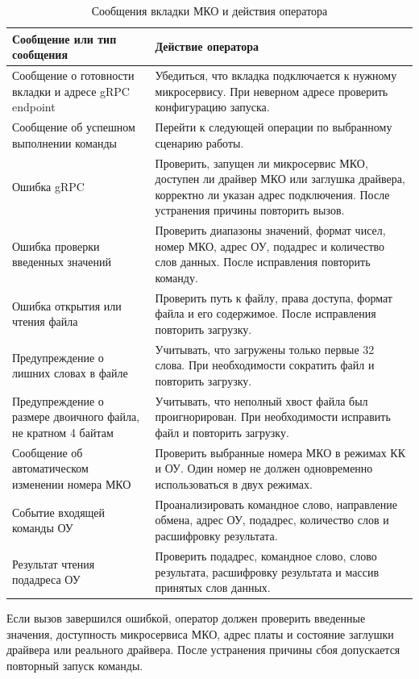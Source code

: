 \begin{table}[H]
	\caption{Сообщения вкладки МКО и действия оператора}
	\begin{tabularx}{\textwidth}{|p{}|X|}
		\hline
		\textbf{Сообщение или тип сообщения} & \textbf{Действие оператора} \\
		\hline
		Сообщение о готовности вкладки и адресе gRPC endpoint & Убедиться, что вкладка подключается к нужному микросервису. При неверном адресе проверить конфигурацию запуска. \\
		\hline
		Сообщение об успешном выполнении команды & Перейти к следующей операции по выбранному сценарию работы. \\
		\hline
		Ошибка gRPC & Проверить, запущен ли микросервис МКО, доступен ли драйвер МКО или заглушка драйвера, корректно ли указан адрес подключения. После устранения причины повторить вызов. \\
		\hline
		Ошибка проверки введенных значений & Проверить диапазоны значений, формат чисел, номер МКО, адрес ОУ, подадрес и количество слов данных. После исправления повторить команду. \\
		\hline
		Ошибка открытия или чтения файла & Проверить путь к файлу, права доступа, формат файла и его содержимое. После исправления повторить загрузку. \\
		\hline
		Предупреждение о лишних словах в файле & Учитывать, что загружены только первые 32 слова. При необходимости сократить файл и повторить загрузку. \\
		\hline
		Предупреждение о размере двоичного файла, не кратном 4 байтам & Учитывать, что неполный хвост файла был проигнорирован. При необходимости исправить файл и повторить загрузку. \\
		\hline
		Сообщение об автоматическом изменении номера МКО & Проверить выбранные номера МКО в режимах КК и ОУ. Один номер не должен одновременно использоваться в двух режимах. \\
		\hline
		Событие входящей команды ОУ & Проанализировать командное слово, направление обмена, адрес ОУ, подадрес, количество слов и расшифровку результата. \\
		\hline
		Результат чтения подадреса ОУ & Проверить подадрес, командное слово, слово результата, расшифровку результата и массив принятых слов данных. \\
		\hline
	\end{tabularx}
\end{table}

Если вызов завершился ошибкой, оператор должен проверить введенные значения, доступность микросервиса МКО, адрес платы и состояние заглушки драйвера или реального драйвера. После устранения причины сбоя допускается повторный запуск команды.
